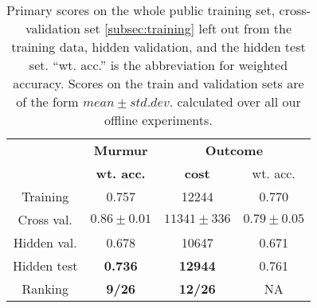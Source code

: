 
\begin{table}[!htp]
\centering
\setlength\tabcolsep{4pt}
\begin{tabular}{c|c|c|c}
    \hline
    & \textbf{Murmur} & \multicolumn{2}{c}{\textbf{Outcome}} \\
    & \textbf{wt. acc.} & \multicolumn{1}{c}{\textbf{cost}} & \multicolumn{1}{c}{wt. acc.} \\ \hline
    Training & 0.757 & 12244 & 0.770 \\
    Cross val. & $0.86\pm 0.01$ & $11341\pm 336$ & $0.79\pm 0.05$ \\ \hline
    Hidden val. & 0.678 & 10647 & 0.671 \\
    Hidden test & \textbf{0.736} & \textbf{12944} & 0.761 \\
    Ranking & \textbf{9/26} & \textbf{12/26} & NA \\
    \hline
\end{tabular}
\caption{Primary scores on the whole public training set, cross-validation set \ref{subsec:training} left out from the training data, hidden validation, and the hidden test set. ``wt. acc.'' is the abbreviation for weighted accuracy. Scores on the train and validation sets are of the form $mean \pm std. dev.$ calculated over all our offline experiments.}
\label{tab:challenge_scores}
\end{table}
